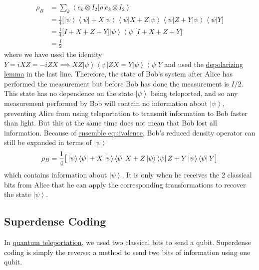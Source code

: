 \documentclass{article}
\newcommand{\ket}[1]{\ensuremath{\left|#1\right\rangle}}
\newcommand{\bra}[1]{\ensuremath{\left\langle#1\right|}}
\begin{document}
    \begin{align}
      \rho_B & = \sum_k \bra{e_k \otimes I_2 } \rho \ket{e_k \otimes I_2} \\
             & = \frac{1}{4} \big[ \ket{\psi} \bra{\psi} + X \ket{\psi} \bra{\psi} X  + Z \ket{\psi} \bra{\psi} Z + Y \ket{\psi} \bra{\psi} Y \big] \\
             & = \frac{1}{4} \big[ I + X + Z + Y \big] \ket{\psi} \bra{\psi} \big[ I + X + Z + Y \big] \\ 
             & = \frac{I}{2}
    \end{align}
    where we have used the identity $Y = iXZ = -iZX \implies XZ \ket{\psi} \bra{\psi} Z X = Y \ket{\psi} \bra{\psi} Y$ and used the \hyperref[thm:depolarizing-lemma]{depolarizing lemma} in the last line. Therefore, the state of Bob's system after Alice has performed the measurement but before Bob has done the measurement is $I/2$. This state has no dependence on the state $\ket{\psi}$ being teleported, and so any measurement performed by Bob will contain no information about $\ket{\psi}$, preventing Alice from using teleportation to transmit information to Bob faster than light. But this at the same time does not mean that Bob lost all information. Because of \hyperref[thm:ensemble-equivalence]{ensemble equivalence}, Bob's reduced density operator can still be expanded in terms of $\ket{\psi}$ 
    \begin{equation}
      \rho_B = \frac{1}{4} \big[ \ket{\psi} \bra{\psi} + X \ket{\psi} \bra{\psi} X  + Z \ket{\psi} \bra{\psi} Z + Y \ket{\psi} \bra{\psi} Y \big] \\
    \end{equation}
    which contains information about $\ket{\psi}$. It is only when he receives the 2 classical bits from Alice that he can apply the corresponding transformations to recover the state $\ket{\psi}$. 

  \subsection{Superdense Coding} 

    In \hyperref[thm:quantum-teleportation]{quantum teleportation}, we used two classical bits to send a qubit. Superdense coding is simply the reverse: a method to send two bits of information using one qubit.  
\end{document}
